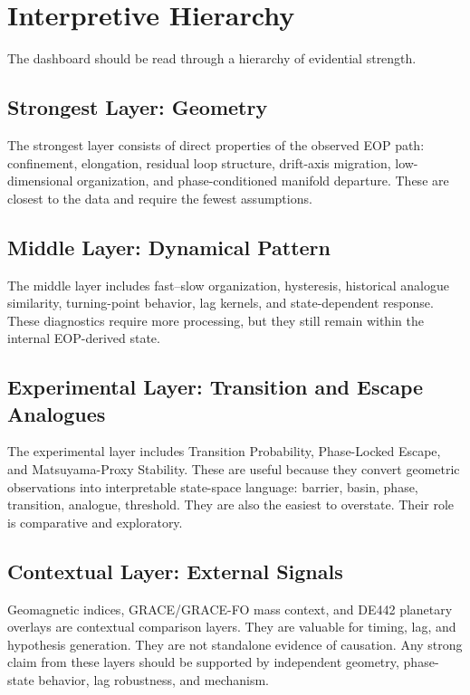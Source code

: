 \documentclass[11pt]{article}
\begin{document}
\section{Interpretive Hierarchy}
The dashboard should be read through a hierarchy of evidential strength.

\subsection{Strongest Layer: Geometry}
The strongest layer consists of direct properties of the observed EOP path: confinement, elongation, residual loop structure, drift-axis migration, low-dimensional organization, and phase-conditioned manifold departure. These are closest to the data and require the fewest assumptions.

\subsection{Middle Layer: Dynamical Pattern}
The middle layer includes fast--slow organization, hysteresis, historical analogue similarity, turning-point behavior, lag kernels, and state-dependent response. These diagnostics require more processing, but they still remain within the internal EOP-derived state.

\subsection{Experimental Layer: Transition and Escape Analogues}
The experimental layer includes Transition Probability, Phase-Locked Escape, and Matsuyama-Proxy Stability. These are useful because they convert geometric observations into interpretable state-space language: barrier, basin, phase, transition, analogue, threshold. They are also the easiest to overstate. Their role is comparative and exploratory.

\subsection{Contextual Layer: External Signals}
Geomagnetic indices, GRACE/GRACE-FO mass context, and DE442 planetary overlays are contextual comparison layers. They are valuable for timing, lag, and hypothesis generation. They are not standalone evidence of causation. Any strong claim from these layers should be supported by independent geometry, phase-state behavior, lag robustness, and mechanism.
\end{document}
